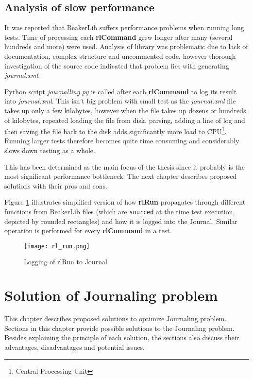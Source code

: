 \section{Analysis of slow performance}
It was reported that BeakerLib suffers performance problems when running long tests. Time of processing each \textbf{rlCommand} grew longer after many (several hundreds and more) were used. Analysis of library was problematic due to lack of documentation, complex structure and uncommented code, however thorough investigation of the source code indicated that problem lies with generating \textit{journal.xml}. 

Python script \textit{journalling.py} is called after each \textbf{rlCommand} to log its result into \textit{journal.xml}. This isn't big problem with small test as the \textit{journal.xml} file takes up only a few kilobytes, however when the file takes up dozens or hundreds of kilobytes, repeated loading the file from disk, parsing, adding a line of log and then saving the file back to the disk adds significantly more load to CPU\footnote{Central Processing Unit}. Running larger tests therefore becomes quite time consuming and considerably slows down testing as a whole.

This has been determined as the main focus of the thesis since it probably is the most significant performance bottleneck. The next chapter describes proposed solutions with their pros and cons.

Figure \ref{fig:rl_run} illustrates simplified version of how \textbf{rlRun} propagates through different functions from BeakerLib files (which are \texttt{sourced} at the time test execution,  depicted by rounded rectangles) and how it is logged into the Journal. Similar operation is performed for every \textbf{rlCommand} in a test.

\begin{figure}[h!]
  \texttt{[image: rl\_run.png]}
  \caption{Logging of rlRun to Journal}
  \label{fig:rl_run}
\end{figure}


\chapter{Solution of Journaling problem}
\label{solutions}

This chapter describes proposed solutions to optimize Journaling problem. Sections in this chapter provide possible solutions to the Journaling problem. Besides explaining the principle of each solution, the sections also discuss their advantages, disadvantages and potential issues.

